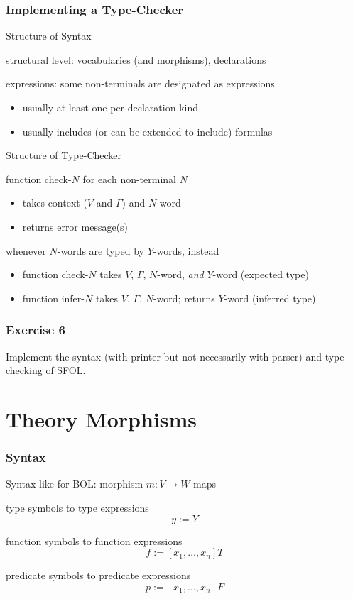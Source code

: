 \begin{frame}\frametitle{Implementing a Type-Checker}
\begin{blockitems}{Structure of Syntax}
\item structural level: vocabularies (and morphisms), declarations
\item expressions: some non-terminals are designated as expressions
 \begin{itemize}
 \item usually at least one per declaration kind
 \item usually includes (or can be extended to include) formulas
 \end{itemize}
\end{blockitems}

\begin{blockitems}{Structure of Type-Checker}
\item function check-$N$ for each non-terminal $N$
 \begin{itemize}
 \item takes context ($V$ and $\Gamma$) and $N$-word
 \item returns error message(s)
 \end{itemize}
\item whenever $N$-words are typed by $Y$-words, instead
 \begin{itemize}
 \item function check-$N$ takes $V$, $\Gamma$, $N$-word, \emph{and} $Y$-word (expected type)
 \item function infer-$N$ takes $V$, $\Gamma$, $N$-word; returns $Y$-word (inferred type)
 \end{itemize}
\end{blockitems}
\end{frame}

\begin{frame}\frametitle{Exercise 6}
Implement the syntax (with printer but not necessarily with parser) and type-checking of SFOL.
\end{frame}

\section{Theory Morphisms}

\begin{frame}\frametitle{Syntax}
\begin{blockitems}{Syntax like for BOL: morphism $m:V\to W$ maps}
\item type symbols to type expressions
 \[y:=Y\]
\item function symbols to function expressions
 \[f:=[x_1,\ldots,x_n]T\]
\item predicate symbols to predicate expressions
 \[p:=[x_1,\ldots,x_n]F\]
\end{blockitems}
\end{frame}

